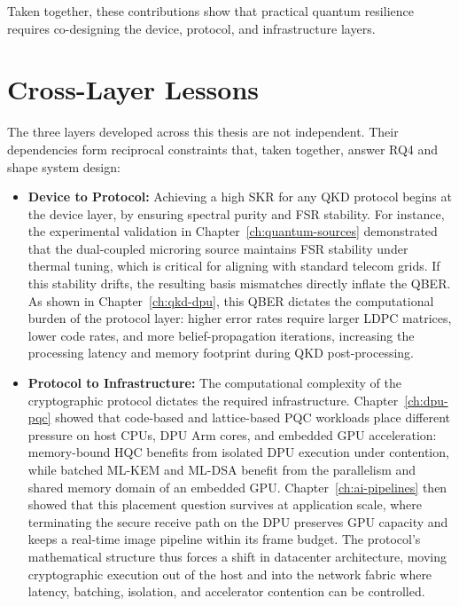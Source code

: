 Taken together, these contributions show that practical quantum resilience requires co-designing the device, protocol, and infrastructure layers.

\section{Cross-Layer Lessons}

The three layers developed across this thesis are not independent. Their dependencies
form reciprocal constraints that, taken together, answer RQ4 and shape system
design:

\begin{itemize}
    \item \textbf{Device to Protocol:} Achieving a high SKR for any QKD protocol begins at the device layer, by ensuring spectral purity and FSR stability. For instance, the experimental validation in Chapter~\ref{ch:quantum-sources} demonstrated that the dual-coupled microring source maintains FSR stability under thermal tuning, which is critical for aligning with standard telecom grids. If this stability drifts, the resulting basis mismatches directly inflate the QBER. As shown in Chapter~\ref{ch:qkd-dpu}, this QBER dictates the computational burden of the protocol layer: higher error rates require larger LDPC matrices, lower code rates, and more belief-propagation iterations, increasing the processing latency and memory footprint during QKD post-processing.
    
    \item \textbf{Protocol to Infrastructure:} The computational complexity of the cryptographic protocol dictates the required infrastructure. Chapter~\ref{ch:dpu-pqc} showed that code-based and lattice-based PQC workloads place different pressure on host CPUs, DPU Arm cores, and embedded GPU acceleration: memory-bound HQC benefits from isolated DPU execution under contention, while batched ML-KEM and ML-DSA benefit from the parallelism and shared memory domain of an embedded GPU. Chapter~\ref{ch:ai-pipelines} then showed that this placement question survives at application scale, where terminating the secure receive path on the DPU preserves GPU capacity and keeps a real-time image pipeline within its frame budget. The protocol's mathematical structure thus forces a shift in datacenter architecture, moving cryptographic execution out of the host and into the network fabric where latency, batching, isolation, and accelerator contention can be controlled.
    

\end{itemize}
